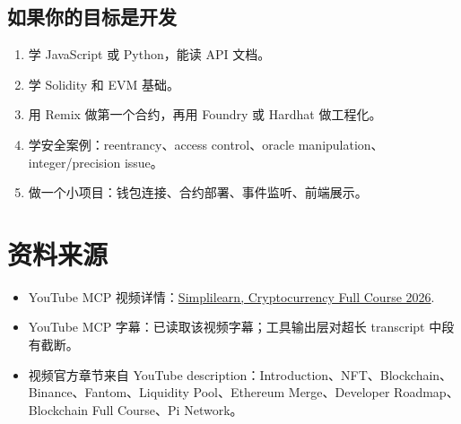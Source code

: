 \documentclass[UTF8,11pt]{ctexart}
\begin{document}
\subsection{如果你的目标是开发}

\begin{enumerate}
  \item 学 JavaScript 或 Python，能读 API 文档。
  \item 学 Solidity 和 EVM 基础。
  \item 用 Remix 做第一个合约，再用 Foundry 或 Hardhat 做工程化。
  \item 学安全案例：reentrancy、access control、oracle manipulation、integer/precision issue。
  \item 做一个小项目：钱包连接、合约部署、事件监听、前端展示。
\end{enumerate}

\section{资料来源}

\begin{itemize}
  \item YouTube MCP 视频详情：\href{https://www.youtube.com/watch?v=bRLIeRRV6X4}{Simplilearn, Cryptocurrency Full Course 2026}.
  \item YouTube MCP 字幕：已读取该视频字幕；工具输出层对超长 transcript 中段有截断。
  \item 视频官方章节来自 YouTube description：Introduction、NFT、Blockchain、Binance、Fantom、Liquidity Pool、Ethereum Merge、Developer Roadmap、Blockchain Full Course、Pi Network。
\end{itemize}
\end{document}
